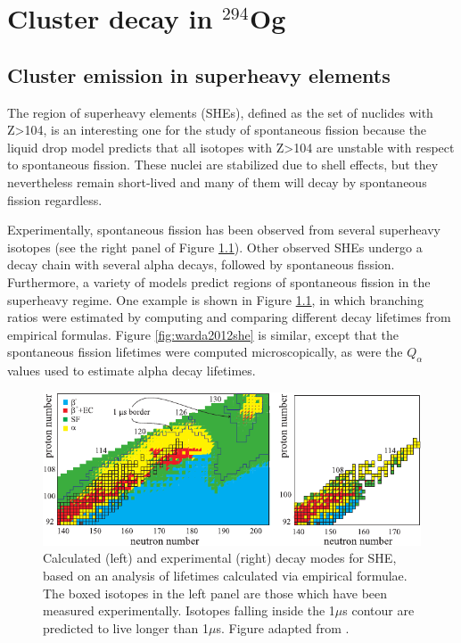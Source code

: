 \chapter{Cluster decay in $^{294}$Og}\label{chap:294Og}

\section{Cluster emission in superheavy elements}

The region of superheavy elements (SHEs), defined as the set of nuclides with Z>104, is an interesting one for the study of spontaneous fission because the liquid drop model predicts that all isotopes with Z>104 are unstable with respect to spontaneous fission. These nuclei are stabilized due to shell effects, but they nevertheless remain short-lived and many of them will decay by spontaneous fission regardless.

Experimentally, spontaneous fission has been observed from several superheavy isotopes (see the right panel of Figure \ref{fig:karpovshedecay}). Other observed SHEs undergo a decay chain with several alpha decays, followed by spontaneous fission. Furthermore, a variety of models predict regions of spontaneous fission in the superheavy regime. One example is shown in Figure \ref{fig:karpovshedecay}, in which branching ratios were estimated by computing and comparing different decay lifetimes from empirical formulas. Figure \ref{fig:warda2012she} is similar, except that the spontaneous fission lifetimes were computed microscopically, as were the $Q_\alpha$ values used to estimate alpha decay lifetimes.


\begin{figure}
	\centering
	\includegraphics[width=0.9\linewidth]{TeX_files/294Og_Karpov_SHEdecay}
	\caption[Calculated and experimental decay modes for SHE]{Calculated (left) and experimental (right) decay modes for SHE, based on an analysis of lifetimes calculated via empirical formulae. The boxed isotopes in the left panel are those which have been measured experimentally. Isotopes falling inside the 1$\mu$s contour are predicted to live longer than 1$\mu$s. Figure adapted from \cite{Karpova}.}
	\label{fig:karpovshedecay}
\end{figure}


